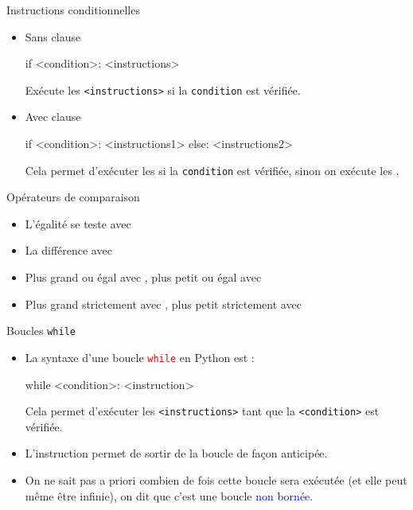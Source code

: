 \documentclass[10pt]{beamer}
\begin{document}
\begin{frame}[fragile]{\Ctitle}{\stitle}
	\begin{alertblock}{Instructions conditionnelles}
		\begin{itemize}
			\item<1-> Sans clause 
			\begin{codepython}
if <condition>:
	<instructions>
			\end{codepython}
			Exécute les {\tt <instructions>} si la {\tt condition} est vérifiée.
			\item<2-> Avec clause 
			\begin{codepython}
if <condition>:
	<instructions1>
else:
	<instructions2>
			\end{codepython}
		Cela permet d'exécuter les {\tt <instructions1>} si la {\tt condition} est vérifiée, sinon on exécute les {\tt <instructions2>}.
		\end{itemize}
	\end{alertblock}
\end{frame}

\begin{frame}{\Ctitle}{\stitle}
\begin{alertblock}{Opérateurs de comparaison}
	\begin{itemize}
		\item<1-> L'égalité se teste avec \kw{==}
		\item<2-> La différence avec \kw{!=}
		\item<3-> Plus grand ou égal avec \kw{>=}, plus petit ou égal avec \kw{<=}
		\item<4-> Plus grand strictement avec \kw{>}, plus petit strictement avec \kw{<}
	\end{itemize}
\end{alertblock}
\end{frame}

\begin{frame}[fragile]{\Ctitle}{\stitle}
	\begin{alertblock}{Boucles {\tt while}}
		\begin{itemize}
			\item<2-> La syntaxe d'une boucle \textcolor{red}{\tt while}  en Python est :
				\begin{codepython}
while <condition>:
	<instruction>
			\end{codepython}
			      Cela permet d'exécuter les {\tt <instructions>} tant que la {\tt <condition>} est  vérifiée.
			\item<3-> L'instruction  permet de sortir de la boucle de façon anticipée.
 			\item<4->  On ne sait pas a priori combien de fois cette boucle sera exécutée (et elle peut même être infinie), on dit que c'est une boucle \textcolor{blue}{non bornée}.
		\end{itemize}
	\end{alertblock}
\end{frame}
\end{document}
